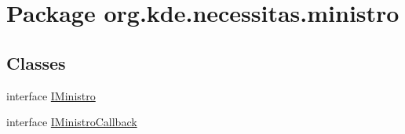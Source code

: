 \hypertarget{namespaceorg_1_1kde_1_1necessitas_1_1ministro}{\section{Package org.\-kde.\-necessitas.\-ministro}
\label{dc/d0b/namespaceorg_1_1kde_1_1necessitas_1_1ministro}
}
\subsection*{Classes}
\begin{DoxyCompactItemize}
\item 
interface \hyperlink{interfaceorg_1_1kde_1_1necessitas_1_1ministro_1_1_i_ministro}{I\-Ministro}
\item 
interface \hyperlink{interfaceorg_1_1kde_1_1necessitas_1_1ministro_1_1_i_ministro_callback}{I\-Ministro\-Callback}
\end{DoxyCompactItemize}
